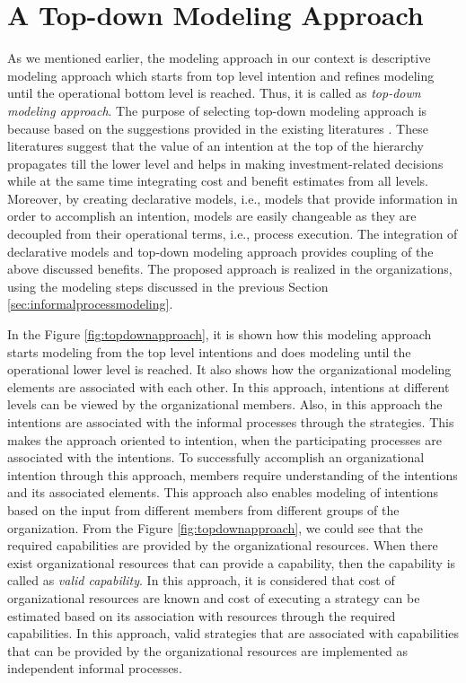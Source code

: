 \section{A Top-down Modeling Approach}
\label{sec:topdownapproach}
As we mentioned earlier, the modeling approach in our context is descriptive modeling approach which starts from top level intention and refines modeling until the operational bottom level is reached. Thus, it is called as \textit{top-down modeling approach}. The purpose of selecting top-down modeling approach is because based on the suggestions provided in the existing literatures \cite{Mandic2010, Bider2005,Sungur2016}. These literatures suggest that the value of an intention at the top of the  hierarchy propagates till the lower level and helps in making investment-related decisions while at the same time integrating cost and benefit estimates from all levels. Moreover, by creating declarative models, i.e., models that provide information in order to accomplish an intention, models are easily changeable as they are decoupled from their operational terms, i.e., process execution. The integration of declarative models and top-down modeling approach provides coupling of the above discussed benefits. The proposed approach is realized in the organizations, using the modeling steps discussed in the previous Section \ref{sec:informalprocessmodeling}. 

In the Figure \ref{fig:topdownapproach}, it is shown how this modeling approach starts modeling from the top level intentions and does modeling until the operational lower level is reached. It also shows how the organizational modeling elements are associated with each other. In this approach, intentions at different levels can be viewed by the organizational members. Also, in this approach the intentions are associated with the informal processes through the strategies. This makes the approach oriented to intention, when the participating processes are associated with the intentions. To successfully accomplish an organizational intention through this approach, members require understanding of the intentions and its associated elements. This approach also enables modeling of intentions based on the input from different members from different groups of the organization. From the Figure \ref{fig:topdownapproach}, we could see that the required capabilities are provided by the organizational resources. When there exist organizational resources that can provide a capability, then the capability is called as \textit{valid capability}. In this approach, it is considered that cost of organizational resources are known and cost of executing a strategy can be estimated based on its association with resources through the required capabilities. In this approach, valid strategies that are associated with capabilities that can be provided by the organizational resources are implemented as independent informal processes.  


